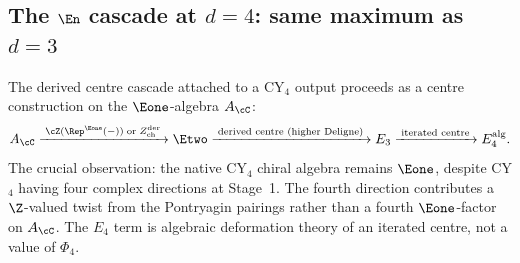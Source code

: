 \subsection{The \texorpdfstring{$\En$}{E-n} cascade at \texorpdfstring{$d = 4$}{d = 4}: same maximum as \texorpdfstring{$d = 3$}{d = 3}}
\label{subsec:cy4-cascade}

The derived centre cascade attached to a CY$_4$ output proceeds as a
centre construction on the \(\Eone\)-algebra \(A_\cC\):
\[
 A_\cC
 \xrightarrow{\;\cZ(\Rep^{\Eone}(-))\; \text{or}\; Z^{\mathrm{der}}_{\mathrm{ch}}\;}
 \Etwo
 \xrightarrow{\;\text{derived centre (higher Deligne)}\;}
 E_3
 \xrightarrow{\;\text{iterated centre}\;}
 E_4^{\mathrm{alg}} .
\]
The crucial observation: the native CY$_4$ chiral algebra remains
\(\Eone\), despite CY$_4$ having four complex directions at Stage~1.
The fourth direction contributes a $\Z$-valued twist from the Pontryagin
pairings
rather than a fourth \(\Eone\)-factor on \(A_\cC\). The \(E_4\) term is
algebraic deformation theory of an iterated centre, not a value of
\(\Phi_4\).

